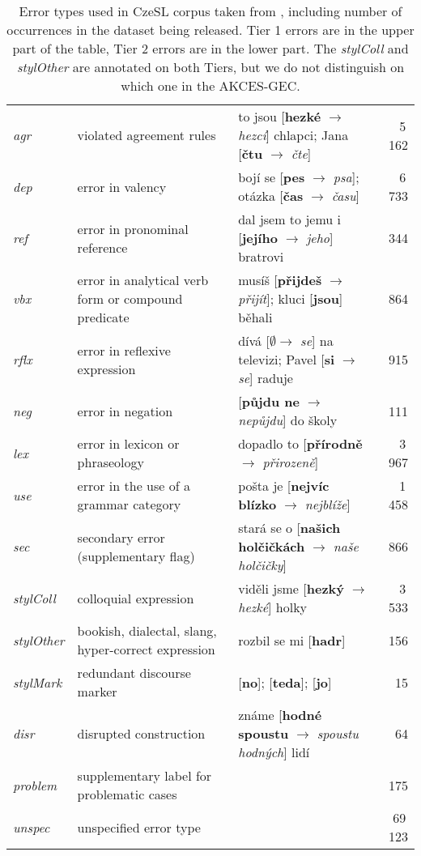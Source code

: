 \documentclass[11pt,a4paper]{article}
\begin{document}
\begin{table*}[ht!]
\begin{tabular}{l|l|l|r}
\emph{agr} & violated agreement rules & to jsou [\textbf{hezké} $\rightarrow$ \emph{hezcí}] chlapci; Jana [\textbf{čtu} $\rightarrow$ \emph{čte}] & 5\,162 \\
\emph{dep} & error in valency & bojí se [\textbf{pes} $\rightarrow$ \emph{psa}]; otázka [\textbf{čas} $\rightarrow$ \emph{času}] & 6\,733 \\ \emph{ref} & error in pronominal reference  & dal jsem to jemu i [\textbf{jejího} $\rightarrow$ \emph{jeho}] bratrovi & 344 \\
\emph{vbx} & error in analytical verb form or compound predicate & musíš [\textbf{přijdeš} $\rightarrow$ \emph{přijít}]; kluci [\textbf{jsou}] běhali & 864 \\ \emph{rflx} & error in reflexive expression & dívá [$\emptyset \rightarrow$ \emph{se}] na televizi; Pavel [\textbf{si} $\rightarrow$ \emph{se}] raduje & 915 \\
\emph{neg} & error in negation & [\textbf{půjdu ne} $\rightarrow$ \emph{nepůjdu}] do školy & 111\\
\emph{lex} & error in lexicon or phraseology & dopadlo to [\textbf{přírodně} $\rightarrow$ \emph{přirozeně}] & 3\,967 \\
\emph{use} & error in the use of a grammar category & pošta je [\textbf{nejvíc blízko} $\rightarrow$ \emph{nejblíže}]  & 1\,458 \\ \emph{sec} & secondary error (supplementary flag) & stará se o [\textbf{našich holčičkách} $\rightarrow$ \emph{naše holčičky}] & 866 \\
\emph{stylColl} & colloquial expression & viděli jsme [\textbf{hezký} $\rightarrow$ \emph{hezké}] holky & 3\,533 \\
\emph{stylOther} & bookish, dialectal, slang, hyper-correct expression & rozbil se mi [\textbf{hadr}] & 156 \\
\emph{stylMark} & redundant discourse marker & [\textbf{no}]; [\textbf{teda}]; [\textbf{jo}] & 15 \\
\emph{disr} & disrupted construction & známe [\textbf{hodné spoustu} $\rightarrow$ \emph{spoustu hodných}] lidí & 64 \\
\hline
\emph{problem} & supplementary label for problematic cases &  & 175 \\
\hline
\emph{unspec} & unspecified error type &  & 69\,123 \\
    \end{tabular}
    \caption{Error types used in CzeSL corpus taken from \cite{CzeSL:TSD2012}, including number of occurrences in the dataset being released. Tier 1 errors are in the upper part of the table, Tier 2 errors are in the lower part.
    The \textit{stylColl} and \textit{stylOther} are annotated on both Tiers, but we do not distinguish on which one
    in the AKCES-GEC.}
    \label{tab:czesl_errors}
\end{table*}
\end{document}

